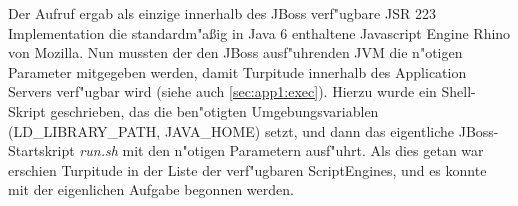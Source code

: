 Der Aufruf ergab als einzige innerhalb des JBoss verf"ugbare JSR 223 Implementation die standardm"a\ss ig in Java 6
enthaltene Javascript Engine Rhino von Mozilla. Nun mussten der den JBoss ausf"uhrenden JVM die n"otigen Parameter
mitgegeben werden, damit Turpitude innerhalb des Application Servers verf"ugbar wird (siehe auch \ref{sec:app1:exec}). 
Hierzu wurde ein Shell-Skript geschrieben, das die ben"otigten Umgebungsvariablen (LD\_LIBRARY\_PATH, JAVA\_HOME) setzt, 
und dann das eigentliche JBoss-Startskript \emph{run.sh} mit den n"otigen Parametern ausf"uhrt. 
Als dies getan war erschien Turpitude in der Liste der verf"ugbaren ScriptEngines, und es konnte mit der eigenlichen
Aufgabe begonnen werden.


